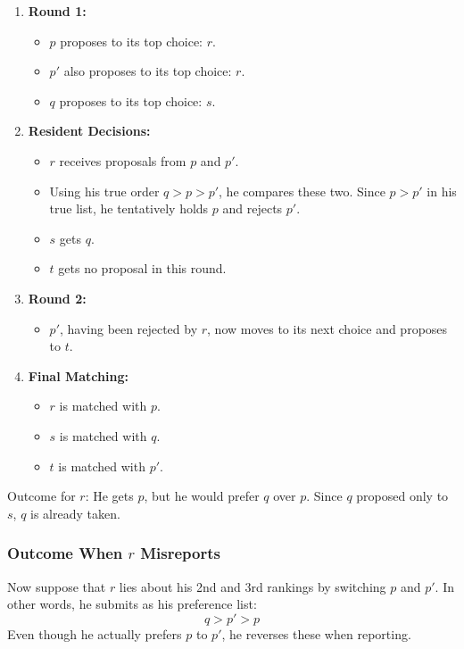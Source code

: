 \documentclass[12pt]{article}
\begin{document}
\begin{enumerate}
    \item \textbf{Round 1:}
    \begin{itemize}
        \item $p$ proposes to its top choice: $r$.
        \item $p'$ also proposes to its top choice: $r$.
        \item $q$ proposes to its top choice: $s$.
    \end{itemize}

    \item \textbf{Resident Decisions:}
    \begin{itemize}
        \item $r$ receives proposals from $p$ and $p'$.
        \item Using his true order $q > p > p'$, he compares these two. Since $p > p'$ in his true list, he tentatively holds $p$ and rejects $p'$.
        \item $s$ gets $q$.
        \item $t$ gets no proposal in this round.
    \end{itemize}

    \item \textbf{Round 2:}
    \begin{itemize}
        \item $p'$, having been rejected by $r$, now moves to its next choice and proposes to $t$.
    \end{itemize}

    \item \textbf{Final Matching:}
    \begin{itemize}
        \item $r$ is matched with $p$.
        \item $s$ is matched with $q$.
        \item $t$ is matched with $p'$.
    \end{itemize}
\end{enumerate}

Outcome for $r$: He gets $p$, but he would prefer $q$ over $p$. Since $q$ proposed only to $s$, $q$ is already taken.

\subsubsection*{Outcome When $r$ Misreports}
Now suppose that $r$ lies about his 2nd and 3rd rankings by switching $p$ and $p'$. In other words, he submits as his preference list:
\[
q > p' > p
\]
Even though he actually prefers $p$ to $p'$, he reverses these when reporting.
\end{document}
